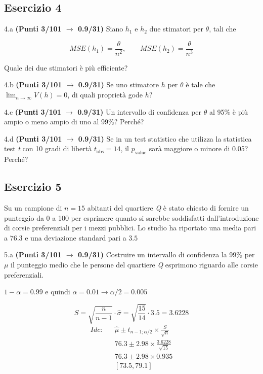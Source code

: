 \documentclass[
  11pt,
]{book}
\theoremstyle{mytheoremstyle}
\theoremstyle{mydefstyle}
\newenvironment{sol}
  {
  \begin{tcolorbox}[enhanced,breakable,arc=0.1mm,boxrule=1pt,colback=white,colframe=iblue,
  title=\bf \fontfamily{lmss}\selectfont \hspace{.5 cm} Soluzione,drop fuzzy shadow]

}{
\end{tcolorbox}
  }
\begin{document}
\subsection{Esercizio 4}\label{esercizio-4-14}

4.a \textbf{(Punti 3/101 \(\rightarrow\) 0.9/31)} Siano \(h_1\) e \(h_2\) due stimatori per \(\theta\), tali che

\[
MSE(h_1) =  \frac{\theta}{n^2}, \qquad MSE(h_2) =  \frac{\theta}{n^3}
\]

Quale dei due stimatori è più efficiente?

4.b \textbf{(Punti 3/101 \(\rightarrow\) 0.9/31)} Se uno stimatore \(h\) per \(\theta\) è tale che \(\lim_{n\to\infty}V(h)=0\), di quali proprietà gode \(h\)?

4.c \textbf{(Punti 3/101 \(\rightarrow\) 0.9/31)} Un intervallo di confidenza per \(\theta\) al 95\% è più ampio o meno ampio di uno al 99\%? Perché?

4.d \textbf{(Punti 3/101 \(\rightarrow\) 0.9/31)} Se in un test statistico che utilizza la statistica test \emph{t} con 10 gradi di libertà \(t_\text{obs}=14\), il \(p_\text{value}\) sarà maggiore o minore di 0.05? Perché?

\subsection{Esercizio 5}\label{esercizio-5-13}

Su un campione di \(n=15\) abitanti del quartiere \emph{Q} è stato chiesto di fornire un punteggio da 0 a 100 per esprimere quanto si sarebbe soddisfatti dall'introduzione di corsie preferenziali per i mezzi pubblici. Lo studio ha riportato una media pari a \(76.3\) e una deviazione standard pari a \(3.5\)

5.a \textbf{(Punti 3/101 \(\rightarrow\) 0.9/31)} Costruire un intervallo di confidenza la 99\% per \(\mu\) il punteggio medio che le persone del quartiere \emph{Q} esprimono riguardo alle corsie preferenziali.

\begin{sol}
\(1-\alpha =0.99\) e quindi \(\alpha=0.01\rightarrow \alpha/2=0.005\)

\[
      S  =\sqrt{\frac {n}{n-1}}\cdot\hat\sigma =
     \sqrt{\frac { 15 }{ 14 }}\cdot 3.5 = 3.6228 
\]
\begin{eqnarray*}
  Idc: & &  \hat\mu \pm  t_{n-1;\alpha/2} \times \frac{S}{\sqrt{n}} \\
     & &  76.3 \pm  2.98 \times \frac{ 3.6228 }{\sqrt{ 15 }} \\
     & &  76.3 \pm  2.98 \times  0.935 \\
     & & [ 73.5 ,  79.1 ]
\end{eqnarray*}

\end{sol}
\end{document}
